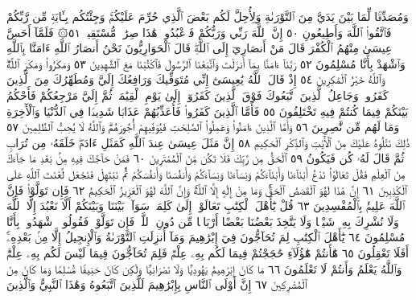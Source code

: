 وَمُصَدِّقࣰا لِّمَا بَيْنَ يَدَيَّ مِنَ ٱلتَّوْرَىٰةِ وَلِأُحِلَّ لَكُم
بَعْضَ ٱلَّذِي حُرِّمَ عَلَيْكُمْۚ وَجِئْتُكُم بِـَٔايَةࣲ مِّن رَّبِّكُمْ
فَٱتَّقُوا۟ ٱللَّهَ وَأَطِيعُونِ ٥٠ إِنَّ ٱللَّهَ رَبِّي وَرَبُّكُمْ فَٱعْبُدُوهُۚ
هَٰذَا صِرَٰطࣱ مُّسْتَقِيمࣱ ٥١۞ فَلَمَّآ أَحَسَّ عِيسَىٰ مِنْهُمُ
ٱلْكُفْرَ قَالَ مَنْ أَنصَارِيٓ إِلَى ٱللَّهِۖ قَالَ ٱلْحَوَارِيُّونَ نَحْنُ
أَنصَارُ ٱللَّهِ ءَامَنَّا بِٱللَّهِ وَٱشْهَدْ بِأَنَّا مُسْلِمُونَ ٥٢
رَبَّنَآ ءَامَنَّا بِمَآ أَنزَلْتَ وَٱتَّبَعْنَا ٱلرَّسُولَ فَٱكْتُبْنَا مَعَ
ٱلشَّٰهِدِينَ ٥٣ وَمَكَرُوا۟ وَمَكَرَ ٱللَّهُۖ وَٱللَّهُ خَيْرُ ٱلْمَٰكِرِينَ ٥٤
إِذْ قَالَ ٱللَّهُ يَٰعِيسَىٰٓ إِنِّي مُتَوَفِّيكَ وَرَافِعُكَ إِلَيَّ وَمُطَهِّرُكَ
مِنَ ٱلَّذِينَ كَفَرُوا۟ وَجَاعِلُ ٱلَّذِينَ ٱتَّبَعُوكَ فَوْقَ ٱلَّذِينَ
كَفَرُوٓا۟ إِلَىٰ يَوْمِ ٱلْقِيَٰمَةِۖ ثُمَّ إِلَيَّ مَرْجِعُكُمْ فَأَحْكُمُ
بَيْنَكُمْ فِيمَا كُنتُمْ فِيهِ تَخْتَلِفُونَ ٥٥ فَأَمَّا ٱلَّذِينَ كَفَرُوا۟
فَأُعَذِّبُهُمْ عَذَابࣰا شَدِيدࣰا فِي ٱلدُّنْيَا وَٱلْأٓخِرَةِ وَمَا لَهُم
مِّن نَّٰصِرِينَ ٥٦ وَأَمَّا ٱلَّذِينَ ءَامَنُوا۟ وَعَمِلُوا۟ ٱلصَّٰلِحَٰتِ
فَيُوَفِّيهِمْ أُجُورَهُمْۗ وَٱللَّهُ لَا يُحِبُّ ٱلظَّٰلِمِينَ ٥٧ ذَٰلِكَ نَتْلُوهُ
عَلَيْكَ مِنَ ٱلْأٓيَٰتِ وَٱلذِّكْرِ ٱلْحَكِيمِ ٥٨ إِنَّ مَثَلَ
عِيسَىٰ عِندَ ٱللَّهِ كَمَثَلِ ءَادَمَۖ خَلَقَهُۥ مِن تُرَابࣲ ثُمَّ قَالَ لَهُۥ
كُن فَيَكُونُ ٥٩ ٱلْحَقُّ مِن رَّبِّكَ فَلَا تَكُن مِّنَ ٱلْمُمْتَرِينَ ٦٠
فَمَنْ حَآجَّكَ فِيهِ مِنۢ بَعْدِ مَا جَآءَكَ مِنَ ٱلْعِلْمِ فَقُلْ تَعَالَوْا۟
نَدْعُ أَبْنَآءَنَا وَأَبْنَآءَكُمْ وَنِسَآءَنَا وَنِسَآءَكُمْ وَأَنفُسَنَا
وَأَنفُسَكُمْ ثُمَّ نَبْتَهِلْ فَنَجْعَل لَّعْنَتَ ٱللَّهِ عَلَى ٱلْكَٰذِبِينَ ٦١
إِنَّ هَٰذَا لَهُوَ ٱلْقَصَصُ ٱلْحَقُّۚ وَمَا مِنْ إِلَٰهٍ إِلَّا ٱللَّهُۚ وَإِنَّ ٱللَّهَ لَهُوَ
ٱلْعَزِيزُ ٱلْحَكِيمُ ٦٢ فَإِن تَوَلَّوْا۟ فَإِنَّ ٱللَّهَ عَلِيمُۢ بِٱلْمُفْسِدِينَ ٦٣
قُلْ يَٰٓأَهْلَ ٱلْكِتَٰبِ تَعَالَوْا۟ إِلَىٰ كَلِمَةࣲ سَوَآءِۭ بَيْنَنَا
وَبَيْنَكُمْ أَلَّا نَعْبُدَ إِلَّا ٱللَّهَ وَلَا نُشْرِكَ بِهِۦ شَيْـࣰٔا وَلَا يَتَّخِذَ
بَعْضُنَا بَعْضًا أَرْبَابࣰا مِّن دُونِ ٱللَّهِۚ فَإِن تَوَلَّوْا۟ فَقُولُوا۟ ٱشْهَدُوا۟
بِأَنَّا مُسْلِمُونَ ٦٤ يَٰٓأَهْلَ ٱلْكِتَٰبِ لِمَ تُحَآجُّونَ فِيٓ إِبْرَٰهِيمَ
وَمَآ أُنزِلَتِ ٱلتَّوْرَىٰةُ وَٱلْإِنجِيلُ إِلَّا مِنۢ بَعْدِهِۦٓۚ أَفَلَا تَعْقِلُونَ ٦٥
هَٰٓأَنتُمْ هَٰٓؤُلَآءِ حَٰجَجْتُمْ فِيمَا لَكُم بِهِۦ عِلْمࣱ فَلِمَ
تُحَآجُّونَ فِيمَا لَيْسَ لَكُم بِهِۦ عِلْمࣱۚ وَٱللَّهُ يَعْلَمُ وَأَنتُمْ
لَا تَعْلَمُونَ ٦٦ مَا كَانَ إِبْرَٰهِيمُ يَهُودِيࣰّا وَلَا نَصْرَانِيࣰّا
وَلَٰكِن كَانَ حَنِيفࣰا مُّسْلِمࣰا وَمَا كَانَ مِنَ ٱلْمُشْرِكِينَ ٦٧
إِنَّ أَوْلَى ٱلنَّاسِ بِإِبْرَٰهِيمَ لَلَّذِينَ ٱتَّبَعُوهُ وَهَٰذَا ٱلنَّبِيُّ وَٱلَّذِينَ
